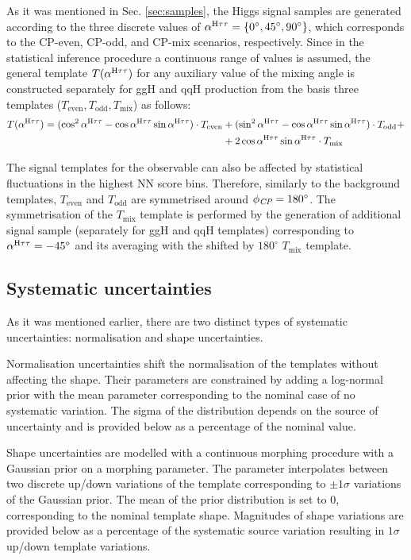 As it was mentioned in Sec. \ref{sec:samples}, the Higgs signal samples are generated according to the three discrete values of $\alpha^{\text{H}\tau\tau} = \{0^\circ, 45^\circ, 90^\circ\}$, which corresponds to the CP-even, CP-odd, and CP-mix scenarios, respectively. Since in the statistical inference procedure a continuous range of \mixa values is assumed, the general template $T(\alpha^{\text{H}\tau\tau})$ for any auxiliary value of the mixing angle is constructed separately for ggH and qqH production from the basis three templates ($T_\text{even}, T_\text{odd}, T_\text{mix}$) as follows:
\begin{align*}
    T(\alpha^{\text{H}\tau\tau}) = (\cos^2\alpha^{\text{H}\tau\tau} - \cos\alpha^{\text{H}\tau\tau}\sin\alpha^{\text{H}\tau\tau}) \cdot T_\text{even} &+ (\sin^2\alpha^{\text{H}\tau\tau} - \cos\alpha^{\text{H}\tau\tau}\sin\alpha^{\text{H}\tau\tau}) \cdot T_\text{odd} + \\
    &+ 2\cos\alpha^{\text{H}\tau\tau}\sin\alpha^{\text{H}\tau\tau} \cdot T_\text{mix}
\end{align*}

The signal templates for the \phicp observable can also be affected by statistical fluctuations in the highest NN score bins. Therefore, similarly to the background templates, $T_\text{even}$ and $T_\text{odd}$ are symmetrised around $\phi_{\textit{CP}}=180^\circ$. The symmetrisation of the $T_\text{mix}$ template is performed by the generation of additional signal sample (separately for ggH and qqH templates) corresponding to $\alpha^{\text{H}\tau\tau} = -45^\circ$ and its averaging with the shifted by $180^\circ$ $T_\text{mix}$ template. 

\subsection{Systematic uncertainties}\label{sec:syst}
As it was mentioned earlier, there are two distinct types of systematic uncertainties: normalisation and shape uncertainties. 

Normalisation uncertainties shift the normalisation of the templates without affecting the shape. Their parameters are constrained by adding a log-normal prior with the mean parameter corresponding to the nominal case of no systematic variation. The sigma of the distribution depends on the source of uncertainty and is provided below as a percentage of the nominal value. 

Shape uncertainties are modelled with a continuous morphing procedure with a Gaussian prior on a morphing parameter. The parameter interpolates between two discrete up/down variations of the template corresponding to $\pm 1\sigma$ variations of the Gaussian prior. The mean of the prior distribution is set to 0, corresponding to the nominal template shape. Magnitudes of shape variations are provided below as a percentage of the systematic source variation resulting in $1\sigma$ up/down template variations. 

